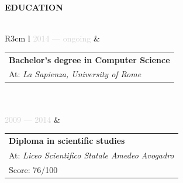 \documentclass{article}
\begin{document}
\textbf{\textcolor{deepblue}{EDUCATION}} \\\\ \hfill
\begin{tabular}{ R{3cm} l }
	\textcolor{lightgray}{2014 — ongoing} & \begin{tabular}[l]{@{}l@{}}
	\textbf{Bachelor's degree in Computer Science} \\
	At: \textit{La Sapienza, University of Rome} \\
\end{tabular} \\\\ \hfill
\textcolor{lightgray}{2009 — 2014}  & \begin{tabular}[l]{@{}l@{}}
\textbf{Diploma in scientific studies} \\
At: \textit{Liceo Scientifico Statale Amedeo Avogadro} \\
Score: 76/100
\end{tabular} \\\\ \hfill
\end{tabular}

\newpage
\end{document}
